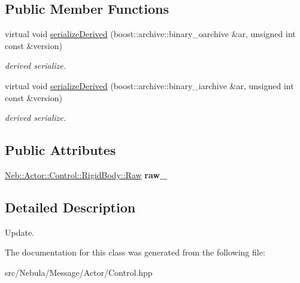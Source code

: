 \subsection*{\-Public \-Member \-Functions}
\begin{DoxyCompactItemize}
\item 
\hypertarget{classNeb_1_1Message_1_1Actor_1_1Control_1_1RigidBody_1_1Update_af4e2d2488ccc9bcf7c6589ccb06d1fef}{virtual void \hyperlink{classNeb_1_1Message_1_1Actor_1_1Control_1_1RigidBody_1_1Update_af4e2d2488ccc9bcf7c6589ccb06d1fef}{serialize\-Derived} (boost\-::archive\-::binary\-\_\-oarchive \&ar, unsigned int const \&version)}\label{classNeb_1_1Message_1_1Actor_1_1Control_1_1RigidBody_1_1Update_af4e2d2488ccc9bcf7c6589ccb06d1fef}

\begin{DoxyCompactList}\small\item\em derived serialize. \end{DoxyCompactList}\item 
\hypertarget{classNeb_1_1Message_1_1Actor_1_1Control_1_1RigidBody_1_1Update_a5008295bad96c1675dfe86b3220f8e62}{virtual void \hyperlink{classNeb_1_1Message_1_1Actor_1_1Control_1_1RigidBody_1_1Update_a5008295bad96c1675dfe86b3220f8e62}{serialize\-Derived} (boost\-::archive\-::binary\-\_\-iarchive \&ar, unsigned int const \&version)}\label{classNeb_1_1Message_1_1Actor_1_1Control_1_1RigidBody_1_1Update_a5008295bad96c1675dfe86b3220f8e62}

\begin{DoxyCompactList}\small\item\em derived serialize. \end{DoxyCompactList}\end{DoxyCompactItemize}
\subsection*{\-Public \-Attributes}
\begin{DoxyCompactItemize}
\item 
\hypertarget{classNeb_1_1Message_1_1Actor_1_1Control_1_1RigidBody_1_1Update_a6a5321d0c2f8d56fc8520285d7b6c5bb}{\hyperlink{classNeb_1_1Actor_1_1Control_1_1RigidBody_1_1Raw}{\-Neb\-::\-Actor\-::\-Control\-::\-Rigid\-Body\-::\-Raw} {\bfseries raw\-\_\-}}\label{classNeb_1_1Message_1_1Actor_1_1Control_1_1RigidBody_1_1Update_a6a5321d0c2f8d56fc8520285d7b6c5bb}

\end{DoxyCompactItemize}


\subsection{\-Detailed \-Description}
\-Update. 

\-The documentation for this class was generated from the following file\-:\begin{DoxyCompactItemize}
\item 
src/\-Nebula/\-Message/\-Actor/\-Control.\-hpp\end{DoxyCompactItemize}
